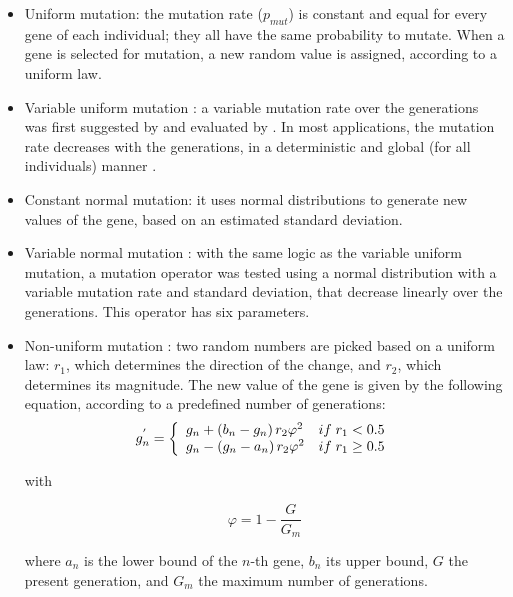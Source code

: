 \documentclass{ametsoc}
\begin{document}
\begin{itemize}
	\item Uniform mutation: the mutation rate ($p_{mut}$) is constant and equal for every gene of each individual; they all have the same probability to mutate. When a gene is selected for mutation, a new random value is assigned, according to a uniform law.
	
	\item Variable uniform mutation \citep{Fogarty1989}: a variable mutation rate over the generations was first suggested by \citet{Holland1992b} and evaluated by \citet{Fogarty1989}. In most applications, the mutation rate decreases with the generations, in a deterministic and global (for all individuals) manner \citep{Back1992b}. 
	
	\item Constant normal mutation: it uses normal distributions to generate new values of the gene, based on an estimated standard deviation.
	
	\item Variable normal mutation \citep{Horton2012a}: with the same logic as the variable uniform mutation, a mutation operator was tested using a normal distribution with a variable mutation rate and standard deviation, that decrease linearly over the generations. This operator has six parameters.
	
	\item Non-uniform mutation \citep{Michalewicz1996}: two random numbers are picked based on a uniform law: $r_{1}$, which determines the direction of the change, and $r_{2}$, which determines its magnitude. The new value of the gene is given by the following equation, according to a predefined number of generations:
	\begin{equation}
	g_{n}^{'} = 
	\left\lbrace \begin{array}{l l} 
	g_{n} + \left(b_{n}-g_{n}\right) r_{2} \varphi^{2} & if \; r_{1} < 0.5 \\
	g_{n} - \left(g_{n}-a_{n}\right) r_{2} \varphi^{2} & if \; r_{1} \geq 0.5 \\
	\end{array} \right.
	\label{eq:nonuniform_mutation}
	\end{equation}
	
	with 
	
	\begin{equation}
	\varphi = 1 - \dfrac{G}{G_{m}}
	\end{equation}
	
	where $a_{n}$ is the lower bound of the $n$-th gene, $b_{n}$ its upper bound, $G$ the present generation, and $G_{m}$ the maximum number of generations.
	

\end{itemize}
\end{document}
